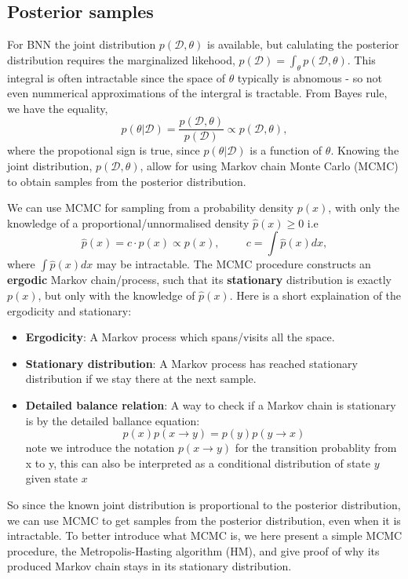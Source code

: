 \subsection*{Posterior samples}
For BNN the joint distribution $p(\mathcal{D},\theta)$ is available, but calulating the posterior
distribution requires the marginalized likehood, $p(\mathcal{D}) = \int_{\theta}
p(\mathcal{D},\theta)$. This integral is often intractable since the space of $\theta$ typically is
abnomous - so not even nummerical approximations of the intergral is tractable. From Bayes rule, we
have the equality, 
$$p(\theta|\mathcal{D}) = \frac{p(\mathcal{D},\theta)}{p(\mathcal{D})} \propto
p(\mathcal{D},\theta),$$ where the propotional sign is true, since $p(\theta|\mathcal{D})$ is a
function of $\theta$. Knowing the joint distribution, $p(\mathcal{D},\theta)$, allow for using Markov
chain Monte Carlo (MCMC) to obtain samples from the posterior distribution.  

\begin{testexample2}
    We can use MCMC for sampling from a probability density $p(x)$, with only the knowledge of a 
    proportional/unnormalised density $\hat p(x) \geq 0$ i.e
    $$\hat p(x) = c\cdot p(x) \propto p(x), \hspace{1cm} c = \int \hat p(x) dx,$$ where $\int \hat
    p(x) dx$ may be intractable. The MCMC procedure constructs an \textbf{ergodic} Markov
    chain/process, such that its \textbf{stationary} distribution is exactly $p(x)$, but only
    with the knowledge of $\hat p(x)$. Here is a short explaination of the ergodicity and stationary:
    \begin{itemize}[noitemsep]
        \item \textbf{Ergodicity}: A Markov process which spans/visits all the space. 
        \item \textbf{Stationary distribution}: A Markov process has reached stationary distribution if
                            we stay there at the next sample. 
        \item \textbf{Detailed balance relation}: A way to check if a Markov chain is
        stationary is by the detailed ballance equation: $$p(x)p(x\rightarrow y) =
        p(y)p(y\rightarrow x)$$ note we introduce the notation $p(x\rightarrow y)$ for the
        transition probablity from x to y, this can also be interpreted as a conditional
        distribution of state $y$ given state $x$  
    \end{itemize}
\end{testexample2}
So since the known joint distribution is proportional to the posterior distribution, we can use MCMC
to get samples from the posterior distribution, even when it is intractable. To better introduce
what MCMC is, we here present a simple MCMC procedure, the Metropolis-Hasting algorithm (HM), and
give proof of why its produced Markov chain stays in its stationary distribution.

